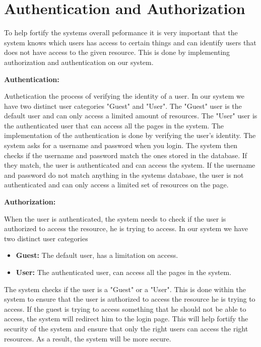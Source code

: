 \section{Authentication and Authorization}

To help fortify the systems overall peformance it is very
important that the system knows which users has
access to certain things and can identify users that does not have
access to the given resource. This is done by implementing authorization
and authentication on our system. \newline


\textbf{Authentication:} 

Authetication the process of verifying the
identity of a user. In our system we have two distinct
user categories "Guest" and "User". The "Guest" user
is the default user and can only access a limited amount of resources.
The "User" user is the
authenticated user that can access all the pages in
the system.
The implementation of the authentication is done by
verifying the user's identity. The system asks for a
username and password when you login. The system
then checks if the username and password match the
ones stored in the database. If they match, the user
is authenticated and can access the system. If the
username and password do not match anything in
the systems database, the user is not authenticated
and can only access a limited set of resources on the
page. \newline

\textbf{Authorization:} 

When the user is authenticated,
the system needs to check if the user is authorized
to access the resource, he is trying to access. In
our system we have two distinct user categories
\begin{itemize}
    \item \textbf{Guest:} The default user, has a limitation on access.
    \item \textbf{User:} The authenticated user, can access all the pages in the system.
\end{itemize}
The system checks if the
user is a "Guest" or a "User". This is done within
the system to ensure that the user is authorized to
access the resource he is trying to access. If the
guest is trying to access something that he should
not be able to access, the system will redirect him to
the login page. This will help fortify the security of
the system and ensure that only the right users can
access the right resources. As a result, the system
will be more secure.

